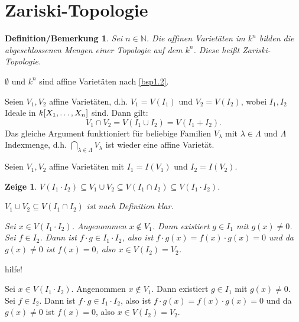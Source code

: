 \documentclass[a4paper,12pt]{scrbook}
\makeatletter
\theoremstyle{blah}
\newtheorem*{zeige}{Zeige}
\newtheorem{db}[dfn]{Definition/Bemerkung}
\theoremstyle{stz}
\renewcommand{\proofname}{Beweis}
\renewenvironment{proof}[1][\proofname]{\par
  \pushQED{\qed}%
  \normalfont \topsep6\p@\@plus6\p@\relax
  \trivlist
  \item[\hskip\labelsep
        \itshape
    #1\@addpunct{:}]\ignorespaces
}{%
  \popQED\endtrivlist\@endpefalse
}
\newcommand{\leer}{\ensuremath{\emptyset}}
\newcommand{\set}[1]{\ensuremath{\mathbb{#1}}}
\newcommand{\N}{\set{N}}
\newcommand{\polyx}{\ensuremath%
  [X_{1},\dotsc,X_{n}]}
\makeatother
\begin{document}
\section{Zariski-Topologie}

\begin{db}Sei $n\in\N$. Die affinen Varietäten im $k^{n}$ bilden die abgeschlossenen Mengen einer Topologie auf dem $k^{n}$. Diese heißt \emph{Zariski-Topologie}.\end{db}
\begin{proof}\begin{prooflist}
\item $\leer$ und $k^{n}$ sind affine Varietäten nach \autoref{bsp1.2}.
\item Seien $V_{1},V_{2}$ affine Varietäten, d.h. $V_{1}=V(I_{1})$ und $V_{2}=V(I_{2})$, wobei $I_{1},I_{2}$ Ideale in $k\polyx$ sind. Dann gilt:
\[V_{1}\cap V_{2}=V(I_{1}\cup I_{2}) = V(I_{1}+I_{2}).\]
Das gleiche Argument funktioniert für beliebige Familien $V_{\lambda}$ mit $\lambda\in\Lambda$ und $\Lambda$ Indexmenge, d.h. $\displaystyle\bigcap_{\lambda\in\Lambda}V_{\lambda}$ ist wieder eine affine Varietät.
\item Seien $V_{1},V_{2}$ affine Varietäten mit $I_{1}=I(V_{1})$ und $I_{2}=I(V_{2})$.
\begin{zeige} $V(I_{1}\cdot I_{2})\subseteq V_{1}\cup V_{2}\subseteq V(I_{1}\cap I_{2})\subseteq V(I_{1}\cdot I_{2})$.
\begin{prooflist}
\item $V_{1}\cup V_{2}\subseteq V(I_{1}\cap I_{2})$ ist nach Definition klar.
\item Sei $x\in V(I_{1}\cdot I_{2})$. Angenommen $x\notin V_{1}$. Dann existiert $g\in I_{1}$ mit $g(x)\neq 0$. Sei $f\in I_{2}$. Dann ist $f\cdot g\in I_{1}\cdot I_{2}$, also ist $f\cdot g(x) = f(x)\cdot g(x) = 0$ und da $g(x)\neq 0$ ist $f(x)=0$, also $x\in V(I_{2})=V_{2}$.
\end{prooflist}\end{zeige}
\end{prooflist}\end{proof}

\begin{w}hilfe!\end{w}

\begin{w}Sei $x\in V(I_{1}\cdot I_{2})$. Angenommen $x\notin V_{1}$. Dann existiert $g\in I_{1}$ mit $g(x)\neq 0$. Sei $f\in I_{2}$. Dann ist $f\cdot g\in I_{1}\cdot I_{2}$, also ist $f\cdot g(x) = f(x)\cdot g(x) = 0$ und da $g(x)\neq 0$ ist $f(x)=0$, also $x\in V(I_{2})=V_{2}$.\end{w}
\end{document}
